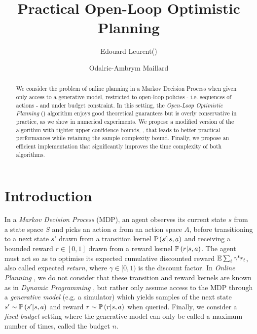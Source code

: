 \documentclass[runningheads, envcountsame, a4paper]{llncs}
\newcommand{\citep}{\cite}
\begin{document}
%
\title{Practical Open-Loop Optimistic Planning}
%
%
\author{Edouard Leurent(\Letter)\and
Odalric-Ambrym Maillard}
%
%
%
\maketitle              %
%

\begin{abstract}
    We consider the problem of online planning in a Markov Decision Process when given only access to a generative model, restricted to open-loop policies - i.e. sequences of actions - and under budget constraint. In this setting, the \textit{Open-Loop Optimistic Planning} (\OLOP) algorithm enjoys good theoretical guarantees but is overly conservative in practice, as we show in numerical experiments. We propose a modified version of the algorithm with tighter upper-confidence bounds, \KLOLOP, that leads to better practical performances while retaining the sample complexity bound. Finally, we propose an efficient implementation that significantly improves the time complexity of both algorithms.
    
\end{abstract}

\section{Introduction}

In a \emph{Markov Decision Process} (MDP), an agent observes its current state $s$ from a state space $S$ and picks an action $a$ from an action space $A$, before transitioning to a next state $s'$ drawn from a transition kernel $\mathbb{P}\left(s'|s,a\right)$ and receiving a bounded reward $r\in[0, 1]$ drawn from a reward kernel $\mathbb{P}\left(r|s, a\right)$. The agent must act so as to optimise its expected cumulative discounted reward $\operatorname*{\mathbb{E}} \sum_t \gamma^t r_t$, also called expected \emph{return}, where $\gamma\in[0,1)$ is the discount factor. In \emph{Online Planning} \cite{Munos2014}, we do not consider that these transition and reward kernels are known as in \emph{Dynamic Programming} \citep{Bellman1957}, but rather only assume access to the MDP through a \emph{generative model} (e.g. a simulator) which yields samples of the next state $s' \sim \mathbb{P}\left(s'|s,a\right)$ and reward $r\sim\mathbb{P}\left(r|s, a\right)$ when queried. Finally, we consider a \emph{fixed-budget} setting where the generative model can only be called a maximum number of times, called the budget $n$. 
\end{document}
